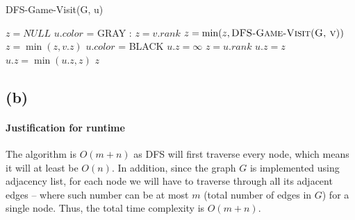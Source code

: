 \documentclass[11pt]{article}
\begin{document}
\begin{algorithm}[H]
\caption{DFS-Game-Visit(G, u)}
    \begin{algorithmic}[1]
        \State $z = NULL$
        \State $u.color$ = GRAY
        :
                \State $z = v.rank$
                \State $z = \min(z, \textsc{DFS-Game-Visit(G, v)})$
            \Else
                \State $z = \min(z, v.z)$
            \EndIf
        \EndFor
        \State $u.color$ = BLACK
            \State $u.z = \infty$
            \State $z = u.rank$
        \Else
                \State $u.z = z$
            \Else
                \State $u.z = \min(u.z, z)$
            \EndIf
        \EndIf
        \State \Return $z$
    \end{algorithmic}
\end{algorithm}

\subsection{(b)}

\paragraph{Justification for runtime} The algorithm is $O(m+n)$ as DFS will first traverse every node, which means it will at least be $O(n)$. In addition, since the graph $G$ is implemented using adjacency list, for each node we will have to traverse through all its adjacent edges -- where such number can be at most $m$ (total number of edges in $G$) for a single node. Thus, the total time complexity is $O(m + n)$.
\end{document}
